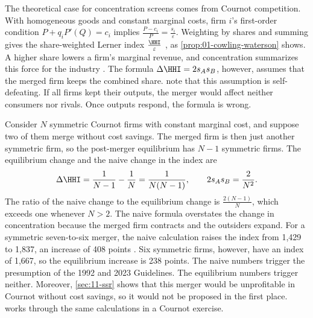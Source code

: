 The theoretical case for concentration screens comes from Cournot competition. With homogeneous goods and
constant marginal costs, firm $i$'s first-order condition $P + q_i P'(Q) = c_i$ implies
$\frac{P - c_i}{P} = \frac{s_i}{\varepsilon}$. Weighting by shares and summing gives the share-weighted Lerner
index $\frac{\HHI}{\varepsilon}$ \citep{CowlingWaterson1976}, as \cref{prop:01-cowling-waterson} shows. A higher
share lowers a firm's marginal revenue, and concentration summarizes this force for the industry
\citep[p.~3]{FarrellShapiro2010}. The formula $\Delta\HHI = 2 s_A s_B$, however, assumes that the merged firm keeps
the combined share. \citet[p.~2]{FarrellShapiro1988} note that this assumption is self-defeating. If all firms
kept their outputs, the merger would affect neither consumers nor rivals. Once outputs respond, the formula is
wrong.

\begin{example}\label{ex:11-naivehhi}
Consider $N$ symmetric Cournot firms with constant marginal cost, and suppose two of them merge without cost
savings. The merged firm is then just another symmetric firm, so the post-merger equilibrium has $N - 1$
symmetric firms. The equilibrium change and the naive change in the index are
\begin{equation*}
\Delta\HHI = \frac{1}{N - 1} - \frac{1}{N} = \frac{1}{N(N - 1)},
\qquad
2 s_A s_B = \frac{2}{N^2}.
\end{equation*}
The ratio of the naive change to the equilibrium change is $\frac{2(N - 1)}{N}$, which exceeds one whenever
$N > 2$. The naive formula overstates the change
in concentration because the merged firm contracts and the outsiders expand. For a symmetric seven-to-six merger,
the naive calculation raises the index from 1,429 to 1,837, an increase of 408 points
\citep[p.~26]{FarrellShapiro2010}. Six symmetric firms, however, have an index of 1,667, so the equilibrium
increase is 238 points. The naive numbers trigger the presumption of the 1992 and 2023 Guidelines. The
equilibrium numbers trigger neither. Moreover, \cref{sec:11-ssr} shows that this merger would be unprofitable in
Cournot without cost savings, so it would not be proposed in the first place.  works through
the same calculations in a Cournot exercise.
\end{example}

